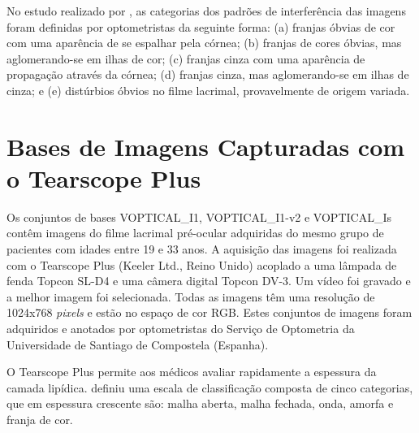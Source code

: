 No estudo realizado por , as categorias dos padrões de interferência das imagens foram definidas por optometristas da seguinte forma: (a) franjas óbvias de cor com uma aparência de se espalhar pela córnea; (b) franjas de cores óbvias, mas aglomerando-se em ilhas de cor; (c) franjas cinza com uma aparência de propagação através da córnea; (d) franjas cinza, mas aglomerando-se em ilhas de cinza; e (e) distúrbios óbvios no filme lacrimal, provavelmente de origem variada.

\section{Bases de Imagens Capturadas com o Tearscope Plus}
\label{sec:metodoBaseTearscope}

Os conjuntos de bases VOPTICAL\_I1, VOPTICAL\_I1-v2 e  VOPTICAL\_Is contêm imagens do filme lacrimal pré-ocular adquiridas do mesmo grupo de pacientes com idades entre 19 e 33 anos. A aquisição das imagens foi realizada com o Tearscope Plus (Keeler Ltd., Reino Unido)  \cite{guillon1997tearscope} acoplado a uma lâmpada de fenda Topcon SL-D4 e uma câmera digital Topcon DV-3. Um vídeo foi gravado e a melhor imagem foi selecionada. Todas as imagens têm uma resolução de 1024x768 \textit{pixels} e estão no espaço de cor RGB. Estes conjuntos de imagens foram adquiridos e anotados por optometristas do Serviço de Optometria da Universidade de Santiago de Compostela (Espanha).

O Tearscope Plus permite aos médicos avaliar rapidamente a espessura da camada lipídica.  definiu uma escala de classificação composta de cinco categorias, que em espessura crescente são: malha aberta, malha fechada, onda, amorfa e franja de cor.



